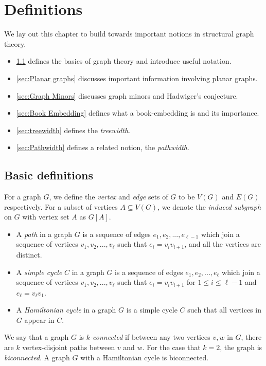 \documentclass[]{report}
\theoremstyle{definition}
\numberwithin{theorem}{section}
\numberwithin{equation}{section}
\begin{document}
\chapter{Definitions}\label{chap:Definitions}
We lay out this chapter to build towards important notions in structural graph theory.

\begin{itemize}
	\item \cref{sec: Basic definitions} defines the basics of graph theory and introduce useful notation.
	\item \cref{sec:Planar graphs} discusses important information involving planar graphs. 
	\item \cref{sec:Graph Minors} discusses graph minors and Hadwiger's conjecture.
	\item \cref{sec:Book Embedding} defines what a book-embedding is and its importance. 
	\item \cref{sec:treewidth} defines the \textit{treewidth}.
	\item \cref{sec:Pathwidth} defines a related notion, the \textit{pathwidth}.
\end{itemize}
\section{Basic definitions}\label{sec: Basic definitions}
For a graph $G$, we define the \textit{vertex} and \textit{edge} sets of $G$ to be $V(G)$ and $E(G)$ respectively.
For a subset of vertices $A \subseteq V(G)$, we denote the \textit{induced subgraph} on $G$ with vertex set $A$ as $G[A]$. 

\begin{itemize}
	\item A \textit{path} in a graph $G$ is a sequence of edges $e_1, e_2, ..., e_{\ell- 1}$ which join a sequence of vertices $v_1, v_2, ..., v_{\ell}$ such that $e_i = v_iv_{i + 1}$, and all the vertices are distinct. 
	\item A \textit{simple cycle} $C$ in a graph $G$ is a sequence of edges $e_1, e_2, ..., e_{\ell}$ which join a sequence of vertices $v_1, v_2, ..., v_{\ell}$ such that $e_i = v_iv_{i + 1}$ for $1 \leq i \leq \ell - 1$ and $e_\ell = v_\ell v_1$. 
	\item A \textit{Hamiltonian cycle} in a graph $G$ is a simple cycle $C$ such that all vertices in $G$ appear in $C$.
\end{itemize}

We say that a graph $G$ is \textit{$k$-connected} if between any two vertices $v, w$ in $G$, there are $k$ vertex-disjoint paths between $v$ and $w$. For the case that $k = 2$, the graph is \textit{biconnected}. A graph $G$ with a Hamiltonian cycle is biconnected. 
\end{document}

